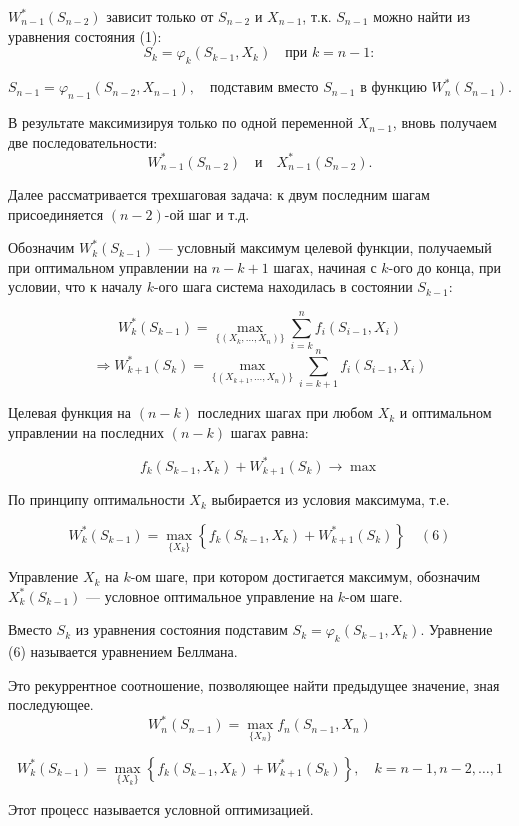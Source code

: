 \documentclass[17pt]{extarticle}
\begin{document}
\( W_{n-1}^*(S_{n-2}) \) зависит только от \( S_{n-2} \) и \( X_{n-1} \), т.к. \( S_{n-1} \) можно найти из уравнения состояния (1):
\[
    S_k = \varphi_k(S_{k-1}, X_k) \quad \text{при } k = n-1:
\]

\[
    S_{n-1} = \varphi_{n-1}(S_{n-2}, X_{n-1}), \quad \text{подставим вместо } S_{n-1} \text{ в функцию } W_n^*(S_{n-1}).
\]

В результате максимизируя только по одной переменной \( X_{n-1} \), вновь получаем две последовательности:
\[
    W_{n-1}^*(S_{n-2}) \quad \text{и} \quad X_{n-1}^*(S_{n-2}).
\]

Далее рассматривается трехшаговая задача: к двум последним шагам присоединяется \( (n-2) \)-ой шаг и т.д.

Обозначим \( W_k^*(S_{k-1}) \) — условный максимум целевой функции,
получаемый при оптимальном управлении на \( n - k + 1 \) шагах, начиная с \( k \)-ого до конца, при условии,
что к началу \( k \)-ого шага система находилась в состоянии \( S_{k-1} \):

\[
    W_k^*(S_{k-1}) = \max_{\{(X_k, \ldots, X_n)\}} \sum_{i=k}^n f_i(S_{i-1}, X_i)
\]
\[
    \Rightarrow W_{k+1}^*(S_k) = \max_{\{(X_{k+1}, \ldots, X_n)\}} \sum_{i=k+1}^n f_i(S_{i-1}, X_i)
\]

Целевая функция на \( (n - k) \) последних шагах при любом \( X_k \) и оптимальном управлении на последних \( (n - k) \) шагах равна:

\[
    f_k(S_{k-1}, X_k) + W_{k+1}^*(S_k) \rightarrow \max
\]

По принципу оптимальности \( X_k \) выбирается из условия максимума, т.е.

\[
    W_k^*(S_{k-1}) = \max_{\{X_k\}} \left\{ f_k(S_{k-1}, X_k) + W_{k+1}^*(S_k) \right\} \quad (6)
\]

Управление \( X_k \) на \( k \)-ом шаге, при котором достигается максимум,
обозначим \( X_k^*(S_{k-1}) \) — условное оптимальное управление на \( k \)-ом шаге.

Вместо \( S_k \) из уравнения состояния подставим \( S_k = \varphi_k(S_{k-1}, X_k) \).
Уравнение (6) называется уравнением Беллмана.

Это рекуррентное соотношение, позволяющее найти предыдущее значение, зная последующее.
\[
    W_n^*(S_{n-1}) = \max_{\{X_n\}} f_n(S_{n-1}, X_n)
\]

\[
    W_k^*(S_{k-1}) = \max_{\{X_k\}} \left\{ f_k(S_{k-1}, X_k) + W_{k+1}^*(S_k) \right\}, \quad k = n-1, n-2, \ldots, 1
\]

Этот процесс называется условной оптимизацией.
\end{document}

